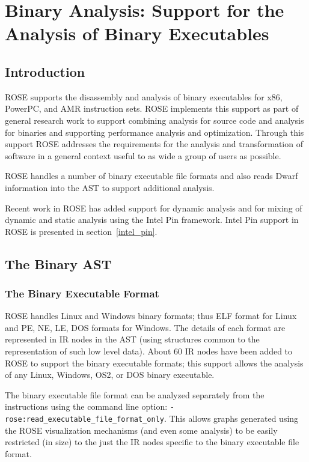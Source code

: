 
\chapter{Binary Analysis: Support for the Analysis of Binary Executables}

\label{binaryAnalysis::overview}

\section{Introduction}

   ROSE supports the disassembly and analysis of binary executables for x86, PowerPC, and AMR
instruction sets.  ROSE implements this support as part of general research work
to support combining analysis for source code and analysis for binaries and supporting
performance analysis and optimization.  Through this support ROSE addresses the
requirements for the analysis and transformation of software in a general context useful
to as wide a group of users as possible.

   ROSE handles a number of binary executable file formats and also reads Dwarf information
into the AST to support additional analysis.

   Recent work in ROSE has added support for dynamic analysis and for mixing of dynamic
and static analysis using the Intel Pin framework. 
Intel Pin support in ROSE is presented in section~\ref{intel_pin}.

\section{The Binary AST}

\subsection{The Binary Executable Format}

    ROSE handles Linux and Windows binary formats; thus ELF format for Linux and PE, NE,
LE, DOS formats for Windows.  The details of each format are represented in IR nodes in
the AST (using structures common to the representation of such low level data).  About
60 IR nodes have been added to ROSE to support the binary executable formats; this
support allows the analysis of any Linux, Windows, OS\/2, or DOS binary executable.

   The binary executable file format can be analyzed separately from the instructions
using the command line option: {\tt -rose:read\_executable\_file\_format\_only}.  This
allows graphs generated using the ROSE visualization mechanisms (and even some analysis) 
to be easily restricted (in size) to the just the IR nodes specific to the binary
executable file format.

